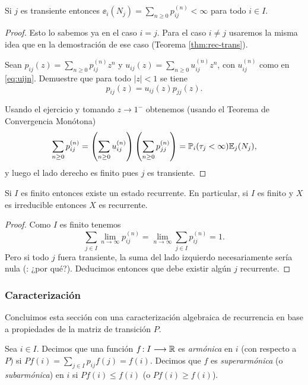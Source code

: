 \begin{prop}
Si $j$ es transiente entonces $\ee_i(N_j)=\sum_{n\geq0}p_{ij}^{(n)}<\infty$ para todo $i\in I$.
\end{prop}

\begin{proof}
Esto lo sabemos ya en el caso $i=j$.
Para el caso $i\neq j$ usaremos la misma idea que en la demostración de ese caso (Teorema \ref{thm:rec-trans}).
\begin{exer}
Sean $p_{ij}(z)=\sum_{n\geq0}p^{(n)}_{ij}z^n$ y $u_{ij}(z)=\sum_{n\geq0}u^{(n)}_{ij}z^n$, con $u^{(n)}_{ij}$ como en \eqref{eq:uijn}.
Demuestre que para todo $|z|<1$ se tiene
\[p_{ij}(z)=u_{ij}(z)p_{jj}(z).\]
\end{exer}
\noindent Usando el ejercicio y tomando $z\to1^-$ obtenemos (usando el Teorema de Convergencia Monótona)
\[\sum_{n\geq0}p_{ij}^{(n)}=\left(\sum_{n\geq0}u_{ij}^{(n)}\right)\left(\sum_{n\geq0}p_{jj}^{(n)}\right)=\mathbb{P}_i(\tau_j<\infty)\mathbb{E}_j(N_j),\]
y luego el lado derecho es finito pues $j$ es transiente.
\end{proof}

\begin{cor}\label{cor:finito-rec}
Si $I$ es finito entonces existe un estado recurrente.
En particular, si $I$ es finito y $X$ es irreducible entonces $X$ es recurrente.
\end{cor}

\begin{proof}
Como $I$ es finito tenemos
\[\textstyle\sum_{j\in I}\lim_{n\to\infty}p^{(n)}_{ij}=\lim_{n\to\infty}\sum_{j\in I}p^{(n)}_{ij}=1.\]
Pero si todo $j$ fuera transiente, la suma del lado izquierdo necesariamente sería nula (\uexers: ¿por qué?).
Deducimos entonces que debe existir algún $j$ recurrente.
\end{proof}

\subsubsection{Caracterización}

Concluimos esta sección con una caracterización algebraica de recurrencia en base a propiedades de la matriz de transición $P$.

\begin{defn}
Sea $i\in I$.
Decimos que una función $f\!:I\longrightarrow\mathbb{R}$ es \emph{armónica} en $i$ (con respecto a $P$) si $Pf(i)=\sum_{j\in I}p_{ij}f(j)=f(i)$.
Decimos que $f$ es \emph{superarmónica} (o \emph{subarmónica}) en $i$ si $Pf(i)\leq f(i)$ (o $Pf(i)\geq f(i)$).
\end{defn}


